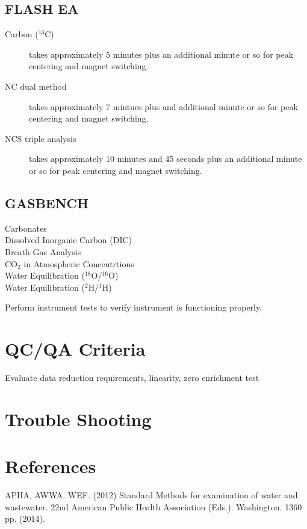 \documentclass[12pt]{../SOP3_beta}\usepackage[]{graphicx}\usepackage[]{color}
\begin{document}
\subsection{FLASH EA}

\begin{description}

\item[Carbon ($^{13}$C)] 
takes approximately 5 minutes plus an additional minute or so for peak centering and magnet switching.

\item[NC dual method] 
takes approximately 7 mintues plus and additional minute or so for peak centering and magnet switching.

\item[NCS triple analysis] 
takes approximately 10 minutes and 45 seconds plus an additional minute or so for peak centering and magnet switching.

\end{description}

\subsection{GASBENCH}

\begin{description}

\item[Carbonates]

\item[Dissolved Inorganic Carbon (DIC)]

\item[Breath Gas Analysis]

\item[CO$_2$ in Atmospheric Concentrtions]

\item[Water Equilibration ($^{18}$O/$^{16}$O)]

\item[Water Equilibration ($^2$H/$^1$H)]

\end{description}

\NP Perform instrument tests to verify instrument is functioning properly.

\section{QC/QA Criteria}

\NP Evaluate data reduction requirements, linearity, zero enrichment test

\section{Trouble Shooting}

\section{References}

\NP APHA, AWWA. WEF. (2012) Standard Methods for examination of water and wastewater. 22nd American Public Health Association (Eds.). Washington. 1360 pp. (2014).
\end{document}
